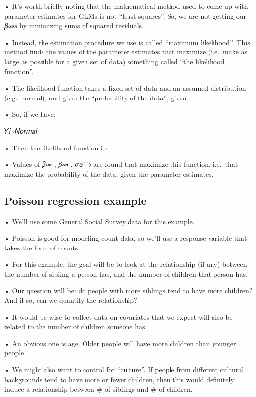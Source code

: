 \documentclass[
  letterpaper,
  DIV=11,
  numbers=noendperiod]{scrreprt}
\begin{document}
• It's worth briefly noting that the mathematical method used to come up
with parameter estimates for GLMs is not ``least squares''. So, we are
not getting our 𝛽መ𝑠 by minimizing sums of squared residuals.

• Instead, the estimation procedure we use is called ``maximum
likelihood''. This method finds the values of the parameter estimates
that maximize (i.e.~make as large as possible for a given set of data)
something called ``the likelihood function''.

• The likelihood function takes a fixed set of data and an assumed
distribution (e.g.~normal), and gives the ``probability of the data'',
given

• So, if we have:

𝑌𝑖\textasciitilde 𝑁𝑜𝑟𝑚𝑎𝑙

• Then the likelihood function is:

• Values of 𝛽መ , 𝛽መ , 𝜎ො are found that maximize this function,
i.e.~that maximize the probability of the data, given the parameter
estimates.

\hypertarget{poisson-regression-example}{%
\subsection{Poisson regression
example}\label{poisson-regression-example}}

• We'll use some General Social Survey data for this example.

• Poisson is good for modeling count data, so we'll use a response
variable that takes the form of counts.

• For this example, the goal will be to look at the relationship (if
any) between the number of sibling a person has, and the number of
children that person has.

• Our question will be: do people with more siblings tend to have more
children? And if so, can we quantify the relationship?

• It would be wise to collect data on covariates that we expect will
also be related to the number of children someone has.

• An obvious one is age. Older people will have more children than
younger people.

• We might also want to control for ``culture''. If people from
different cultural backgrounds tend to have more or fewer children, then
this would definitely induce a relationship between \# of siblings and
\# of children.
\end{document}
